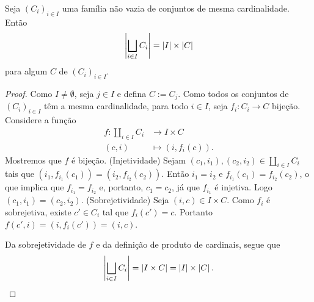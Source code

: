 \begin{prop}
\label{conj:prop.card.un.dis}
Seja $(C_i)_{i \in I}$ uma família não vazia de conjuntos de mesma cardinalidade. Então
	\begin{equation*}
	\left\vert{\bigsqcup_{i \in I} C_i}\right\vert = \left\vert{I}\right\vert \times \left\vert{C}\right\vert
	\end{equation*}
para algum $C$ de $(C_i)_{i \in I}$.
\end{prop}
\begin{proof}
Como $I \neq \emptyset$, seja $j \in I$ e defina $C := C_j$. Como todos os conjuntos de $(C_i)_{i \in I}$ têm a mesma cardinalidade, para todo $i \in I$, seja $f_i: C_i \to C$ bijeção. Considere a função
	\begin{align*}
	f: \coprod_{i \in I} C_i &\to I \times C \\
			(c,i) &\mapsto (i,f_i(c)).
	\end{align*}
Mostremos que $f$ é bijeção. (Injetividade) Sejam $(c_1,i_1),(c_2,i_2) \in \coprod_{i \in I} C_i$ tais que $(i_1,f_{i_1}(c_1))=(i_2,f_{i_2}(c_2))$. Então $i_1=i_2$ e $f_{i_1}(c_1)=f_{i_2}(c_2)$, o que implica que $f_{i_1}=f_{i_2}$ e, portanto, $c_1=c_2$, já que $f_{i_1}$ é injetiva. Logo $(c_1,i_1)=(c_2,i_2)$. (Sobrejetividade) Seja $(i,c) \in I \times C$. Como $f_i$ é sobrejetiva, existe $c' \in C_i$ tal que $f_i(c')=c$. Portanto $f(c',i)=(i,f_i(c'))=(i,c)$.

Da sobrejetividade de $f$ e da definição de produto de cardinais, segue que
	\begin{equation*}
	\left\vert{\bigsqcup_{i \in I} C_i}\right\vert = \left\vert{I \times C}\right\vert = \left\vert{I}\right\vert \times \left\vert{C}\right\vert.
	\end{equation*}
\end{proof}


